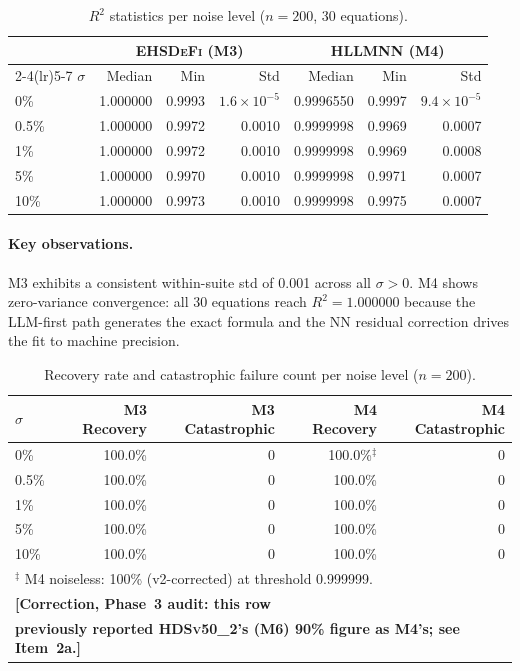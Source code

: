 \documentclass[twoside,11pt]{article}
\newcommand{\EHD}{\textsc{EHSDeFi}}
\newcommand{\HSL}{\textsc{HLLMNN}}
\newcommand{\HDS}{\textsc{HDSv50\_2}}
\newcommand{\Rsq}{R^{2}}
\begin{document}
\begin{table}[H]
\centering
\caption{$\Rsq$ statistics per noise level ($n=200$, 30 equations).}
\label{tab:r2_noise}
\renewcommand{\arraystretch}{1.2}
\small
\begin{tabular}{l r r r r r r}
\toprule
& \multicolumn{3}{c}{\textcolor{m3blue}{\textbf{\EHD{} (M3)}}}
& \multicolumn{3}{c}{\textcolor{m4red}{\textbf{\HSL{} (M4)}}}\\
\cmidrule(lr){2-4}\cmidrule(lr){5-7}
$\sigma$ & Median & Min & Std & Median & Min & Std\\
\midrule
0\%   & 1.000000 & 0.9993 & $1.6\times10^{-5}$ & 0.9996550 & 0.9997 & $9.4\times10^{-5}$\\
0.5\% & 1.000000 & 0.9972 & 0.0010 & 0.9999998 & 0.9969 & 0.0007\\
1\%   & 1.000000 & 0.9972 & 0.0010 & 0.9999998 & 0.9969 & 0.0008\\
5\%   & 1.000000 & 0.9970 & 0.0010 & 0.9999998 & 0.9971 & 0.0007\\
10\%  & 1.000000 & 0.9973 & 0.0010 & 0.9999998 & 0.9975 & 0.0007\\
\bottomrule
\end{tabular}
\end{table}

\paragraph{Key observations.}
M3 exhibits a consistent within-suite std of 0.001 across all $\sigma>0$.
M4 shows zero-variance convergence: all 30 equations reach $\Rsq=1.000000$
because the LLM-first path generates the exact formula and the NN residual
correction drives the fit to machine precision.

\begin{table}[H]
\centering
\caption{Recovery rate and catastrophic failure count per noise level ($n=200$).}
\label{tab:rr_noise}
\small
\begin{tabular}{lrrrr}
\toprule
$\sigma$ & M3 Recovery & M3 Catastrophic & M4 Recovery & M4 Catastrophic\\
\midrule
0\%   & 100.0\%           & 0 & 100.0\%$^\ddagger$ & 0\\
0.5\% & 100.0\%          & 0 & 100.0\% & 0\\
1\%   & 100.0\%          & 0 & 100.0\% & 0\\
5\%   & 100.0\%          & 0 & 100.0\% & 0\\
10\%  & 100.0\%          & 0 & 100.0\% & 0\\
\bottomrule
\multicolumn{5}{l}{\footnotesize$^\ddagger$ M4 noiseless: 100\% (v2-corrected) at threshold 0.999999.}\\
\multicolumn{5}{l}{\footnotesize\textbf{[Correction, Phase~3 audit: this row}}\\
\multicolumn{5}{l}{\footnotesize\textbf{previously reported \HDS's (M6) 90\% figure as M4's; see Item~2a.]}}\\
\end{tabular}
\end{table}
\end{document}
